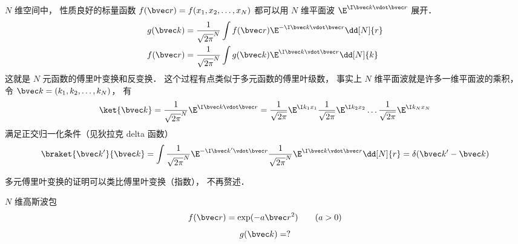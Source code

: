 

$N$ 维空间中， 性质良好的标量函数 $f(\bvec r) = f(x_1, x_2, \dots, x_N)$ 都可以用 $N$ 维平面波 $\E^{\I \bvec k\vdot \bvec r}$ 展开．
\begin{align}
g(\bvec k) &= \frac{1}{\sqrt{2\pi}^N} \int f(\bvec r) \E^{-\I \bvec k \vdot \bvec r} \dd[N]{r}\\
f(\bvec r) &= \frac{1}{\sqrt{2\pi}^N} \int g(\bvec k) \E^{\I \bvec k \vdot \bvec r} \dd[N]{k}
\end{align}
这就是 $N$ 元函数的傅里叶变换和反变换． 这个过程有点类似于多元函数的傅里叶级数， 事实上 $N$ 维平面波就是许多一维平面波的乘积， 令 $\bvec k = (k_1, k_2, \dots, k_N)$， 有
\begin{equation}
\ket{\bvec k} = \frac{1}{\sqrt{2\pi}^N}\E^{\I \bvec k \vdot \bvec r} = \frac{1}{\sqrt{2\pi}} \E^{\I k_1 x_1} \frac{1}{\sqrt{2\pi}} \E^{\I k_2 x_2} \dots \frac{1}{\sqrt{2\pi}} \E^{\I k_N x_N}
\end{equation}
满足正交归一化条件（见狄拉克 delta 函数）
\begin{equation}
\braket{\bvec k'}{\bvec k} = \int \frac{1}{\sqrt{2\pi}^N}\E^{-\I \bvec k' \vdot \bvec r} \frac{1}{\sqrt{2\pi}^N}\E^{\I \bvec k \vdot \bvec r} \dd[N]{r} = \delta(\bvec k'- \bvec k)
\end{equation}

多元傅里叶变换的证明可以类比傅里叶变换（指数）， 不再赘述．

\begin{example}{$N$ 维高斯波包}
\begin{equation}
f(\bvec r) = \exp(-a\bvec r^2) \qquad (a > 0)
\end{equation}
\begin{equation}
g(\bvec k) = ?
\end{equation}
\end{example}
